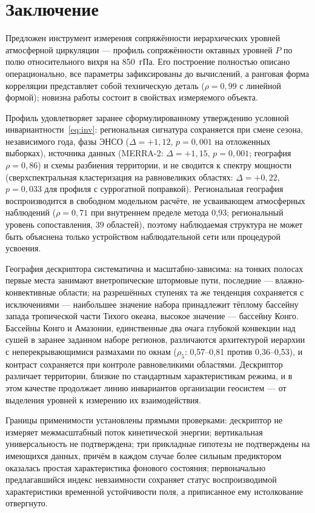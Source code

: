 \documentclass[11pt,a4paper]{article}
\begin{document}
\section{Заключение}
\label{sec:concl}

Предложен инструмент измерения сопряжённости иерархических уровней атмосферной циркуляции --- профиль сопряжённости октавных уровней $P$ по полю относительного вихря на 850~гПа. Его построение полностью описано операционально, все параметры зафиксированы до вычислений, а ранговая форма корреляции представляет собой техническую деталь ($\rho=0{,}99$ с линейной формой); новизна работы состоит в свойствах измеряемого объекта.

Профиль удовлетворяет заранее сформулированному утверждению условной инвариантности~\eqref{eq:inv}: региональная сигнатура сохраняется при смене сезона, независимого года, фазы ЭНСО ($\Delta=+1{,}12$, $p=0{,}001$ на отложенных выборках), источника данных (MERRA-2: $\Delta=+1{,}15$, $p=0{,}001$; география $\rho=0{,}86$) и схемы разбиения территории, и не сводится к спектру мощности (сверхспектральная кластеризация на равновеликих областях: $\Delta=+0{,}22$, $p=0{,}033$ для профиля с суррогатной поправкой). Региональная география воспроизводится в свободном модельном расчёте, не усваивающем атмосферных наблюдений ($\rho=0{,}71$ при внутреннем пределе метода 0,93; региональный уровень сопоставления, 39 областей), поэтому наблюдаемая структура не может быть объяснена только устройством наблюдательной сети или процедурой усвоения.

География дескриптора систематична и масштабно-зависима: на тонких полосах первые места занимают внетропические штормовые пути, последние --- влажно-конвективные области; на разрешённых ступенях та же тенденция сохраняется с исключениями --- наибольшее значение набора принадлежит тёплому бассейну запада тропической части Тихого океана, высокое значение --- бассейну Конго. Бассейны Конго и Амазонии, единственные два очага глубокой конвекции над сушей в заранее заданном наборе регионов, различаются архитектурой иерархии с неперекрывающимися размахами по окнам ($\rho_5$: 0,57--0,81 против 0,36--0,53), и контраст сохраняется при контроле равновеликими областями. Дескриптор различает территории, близкие по стандартным характеристикам режима, и в этом качестве продолжает линию инвариантов организации геосистем --- от выделения уровней к измерению их взаимодействия.

Границы применимости установлены прямыми проверками: дескриптор не измеряет межмасштабный поток кинетической энергии; вертикальная универсальность не подтверждена; три прикладные гипотезы не подтверждены на имеющихся данных, причём в каждом случае более сильным предиктором оказалась простая характеристика фонового состояния; первоначально предлагавшийся индекс невзаимности сохраняет статус воспроизводимой характеристики временн\'{о}й устойчивости поля, а приписанное ему истолкование отвергнуто.
\end{document}

